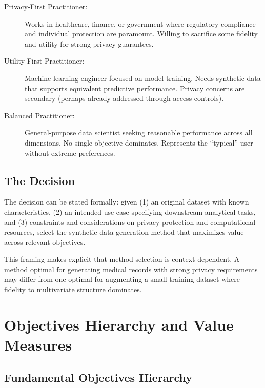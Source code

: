 \documentclass[12pt,a4paper]{article}
\begin{document}
\begin{description}
    \item[Privacy-First Practitioner:] Works in healthcare, finance, or government where regulatory compliance and individual protection are paramount. Willing to sacrifice some fidelity and utility for strong privacy guarantees.
    
    \item[Utility-First Practitioner:] Machine learning engineer focused on model training. Needs synthetic data that supports equivalent predictive performance. Privacy concerns are secondary (perhaps already addressed through access controls).
    
    \item[Balanced Practitioner:] General-purpose data scientist seeking reasonable performance across all dimensions. No single objective dominates. Represents the ``typical'' user without extreme preferences.
\end{description}

\subsection{The Decision}

The decision can be stated formally: given (1) an original dataset with known characteristics, (2) an intended use case specifying downstream analytical tasks, and (3) constraints and considerations on privacy protection and computational resources, select the synthetic data generation method that maximizes value across relevant objectives.

This framing makes explicit that method selection is context-dependent. A method optimal for generating medical records with strong privacy requirements may differ from one optimal for augmenting a small training dataset where fidelity to multivariate structure dominates.

\section{Objectives Hierarchy and Value Measures}

\subsection{Fundamental Objectives Hierarchy}
\end{document}

